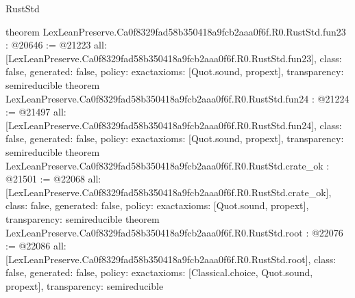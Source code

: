 \begin{lexlean}{RustStd}
\begin{coremodule}
{}
theorem LexLeanPreserve.Ca0f8329fad58b350418a9fcb2aaa0f6f.R0.RustStd.fun23 : @20646 := @21223 {
  all: [LexLeanPreserve.Ca0f8329fad58b350418a9fcb2aaa0f6f.R0.RustStd.fun23],
  class: false,
  generated: false,
  policy: exact{axioms: [Quot.sound, propext]},
  transparency: semireducible
}
theorem LexLeanPreserve.Ca0f8329fad58b350418a9fcb2aaa0f6f.R0.RustStd.fun24 : @21224 := @21497 {
  all: [LexLeanPreserve.Ca0f8329fad58b350418a9fcb2aaa0f6f.R0.RustStd.fun24],
  class: false,
  generated: false,
  policy: exact{axioms: [Quot.sound, propext]},
  transparency: semireducible
}
theorem LexLeanPreserve.Ca0f8329fad58b350418a9fcb2aaa0f6f.R0.RustStd.crate_ok : @21501 := @22068 {
  all: [LexLeanPreserve.Ca0f8329fad58b350418a9fcb2aaa0f6f.R0.RustStd.crate_ok],
  class: false,
  generated: false,
  policy: exact{axioms: [Quot.sound, propext]},
  transparency: semireducible
}
theorem LexLeanPreserve.Ca0f8329fad58b350418a9fcb2aaa0f6f.R0.RustStd.root : @22076 := @22086 {
  all: [LexLeanPreserve.Ca0f8329fad58b350418a9fcb2aaa0f6f.R0.RustStd.root],
  class: false,
  generated: false,
  policy: exact{axioms: [Classical.choice, Quot.sound, propext]},
  transparency: semireducible
}


\end{coremodule}
\end{lexlean}
